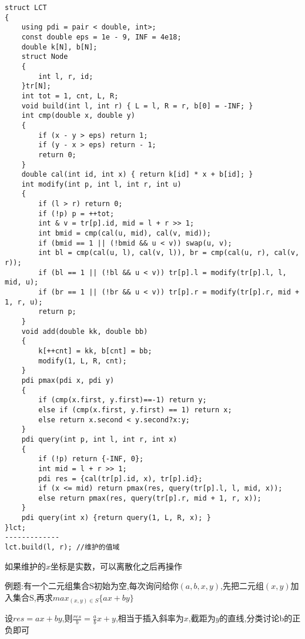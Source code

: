 \documentclass[a4paper,fontset=none]{ctexart}
\begin{document}
\begin{verbatim}
struct LCT
{
    using pdi = pair < double, int>;
    const double eps = 1e - 9, INF = 4e18;
    double k[N], b[N];
    struct Node
    {
        int l, r, id;
    }tr[N];
    int tot = 1, cnt, L, R;
    void build(int l, int r) { L = l, R = r, b[0] = -INF; }
    int cmp(double x, double y)
    {
        if (x - y > eps) return 1;
        if (y - x > eps) return - 1;
        return 0;
    }
    double cal(int id, int x) { return k[id] * x + b[id]; }
    int modify(int p, int l, int r, int u)
    {
        if (l > r) return 0;
        if (!p) p = ++tot;
        int & v = tr[p].id, mid = l + r >> 1;
        int bmid = cmp(cal(u, mid), cal(v, mid));
        if (bmid == 1 || (!bmid && u < v)) swap(u, v);
        int bl = cmp(cal(u, l), cal(v, l)), br = cmp(cal(u, r), cal(v, r));
        if (bl == 1 || (!bl && u < v)) tr[p].l = modify(tr[p].l, l, mid, u);
        if (br == 1 || (!br && u < v)) tr[p].r = modify(tr[p].r, mid + 1, r, u);
        return p;
    }
    void add(double kk, double bb)
    {
        k[++cnt] = kk, b[cnt] = bb;
        modify(1, L, R, cnt);
    }
    pdi pmax(pdi x, pdi y)
    {
        if (cmp(x.first, y.first)==-1) return y;
        else if (cmp(x.first, y.first) == 1) return x;
        else return x.second < y.second?x:y;
    }
    pdi query(int p, int l, int r, int x)
    {
        if (!p) return {-INF, 0};
        int mid = l + r >> 1;
        pdi res = {cal(tr[p].id, x), tr[p].id};
        if (x <= mid) return pmax(res, query(tr[p].l, l, mid, x));
        else return pmax(res, query(tr[p].r, mid + 1, r, x));
    }
    pdi query(int x) {return query(1, L, R, x); }
}lct;
-------------
lct.build(l, r); //维护的值域
\end{verbatim}

如果维护的$x$坐标是实数，可以离散化之后再操作

例题:有一个二元组集合S初始为空,每次询问给你$(a,b,x,y)$,先把二元组$(x,y)$加入集合S,再求$max_{(x,y)\in S}\{ax+by\}$

设$res=ax+by$,则$\frac{res}{b}=\frac{a}{b}x+y$,相当于插入斜率为$x$,截距为$y$的直线,分类讨论b的正负即可
\end{document}
